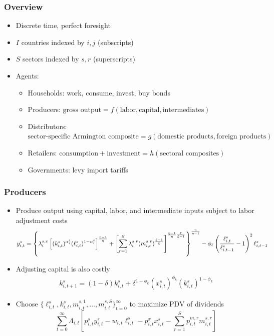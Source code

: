 \documentclass[aspectratio=169,t,10pt,table]{beamer}
\begin{document}
\begin{frame}
  \frametitle{Overview}
  \begin{itemize}\addtolength{\itemsep}{1ex}
  \item Discrete time, perfect foresight 
  \item $I$ countries indexed by $i,j$ (subscripts)
  \item $S$ sectors indexed by $s,r$ (superscripts)
\item Agents:
    \begin{itemize}\addtolength{\itemsep}{0.5ex}
    \item Households: work, consume, invest, buy bonds
    \item Producers: $\text{gross output} = f(\text{labor}, \text{capital}, \text{intermediates})$
    \item Distributors: $\text{sector-specific Armington composite} = g(\text{domestic products},\text{foreign products})$
    \item Retailers: $\text{consumption} + \text{investment} = h(\text{sectoral composites})$
    \item Governments: levy import tariffs
    \end{itemize}
  \end{itemize}
\end{frame}

\begin{frame}
  \frametitle{Producers}
  \begin{itemize}\addtolength{\itemsep}{1ex}
  \item Produce output using capital, labor, and intermediate inputs subject to labor adjustment costs
\begin{align*}
\small
   y^s_{i,t}=\left\{\lambda^{s,v}_i\left[(k^s_{i,t})^{\alpha^s_i} (\ell^s_{i,t})^{1-\alpha^s_i}\right]^{\frac{\eta-1}{\eta}}+\left[\sum_{r=1}^S \lambda^{s,r}_i (m^{s,r}_{i,t})^{\frac{\xi-1}{\xi}}\right]^{\frac{\eta-1}{\eta}\frac{\xi}{\xi-1}}\right\}^{\frac{\eta}{\eta-1}}-\phi_\ell \left(\frac{\ell^s_{i,t}}{\ell^s_{i,t-1}}-1\right)^2\ell^s_{i,t-1}
\end{align*}
\item Adjusting capital is also costly
\begin{align*}
     k^s_{i,t+1}=(1-\delta)k^s_{i,t}+\delta^{1-\phi_k}(x^s_{i,t})^{\phi_k} (k^s_{i,t})^{1-\phi_k}
\end{align*}
\item Choose $\{\ell^s_{i,t},k^s_{i,t},m^{s,1}_{i,t},\ldots,m^{s,S}_{i,t}\}_{t=0}^\infty$ to maximize PDV of dividends
\[\sum_{t=0}^\infty \Lambda_{i,t} \left[p^s_{i,t} y^s_{i,t}-w_{i,t}\ell^s_{i,t}-p^x_{i,t}x^s_{i,t}-\sum_{r=1}^S p^{m,r}_{i,t}m^{s,r}_{i,t}\right]\]
  \end{itemize}
\end{frame}
\end{document}
